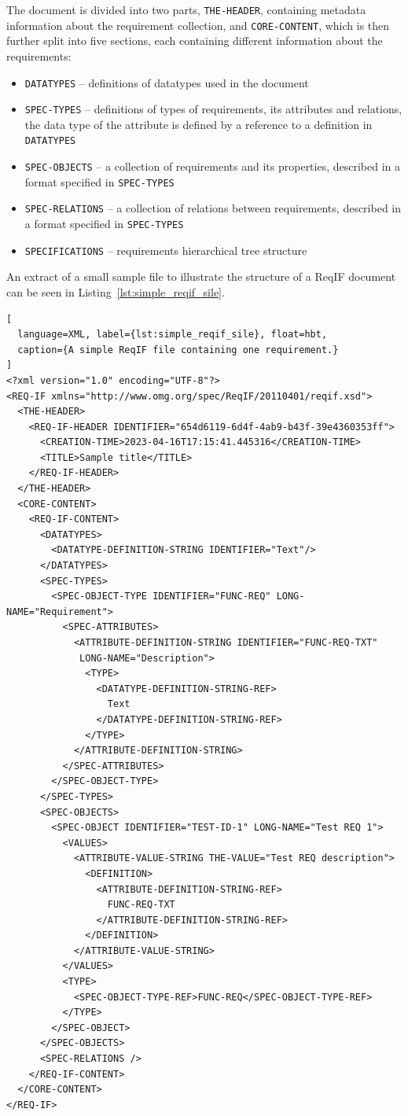 The document is divided into two parts, \texttt{THE-HEADER}, containing metadata information about the requirement collection, and \texttt{CORE-CONTENT}, which is then further split into five sections, each containing different information about the requirements:

\begin{itemize}
  \item \texttt{DATATYPES} -- definitions of datatypes used in the document
  \item \texttt{SPEC-TYPES} -- definitions of types of requirements, its attributes and relations, the data type of the attribute is defined by a reference to a definition in \texttt{DATATYPES}
  \item \texttt{SPEC-OBJECTS} -- a collection of requirements and its properties, described in a format specified in \texttt{SPEC-TYPES}
  \item \texttt{SPEC-RELATIONS} -- a collection of relations between requirements, described in a format specified in \texttt{SPEC-TYPES}
  \item \texttt{SPECIFICATIONS} -- requirements hierarchical tree structure
\end{itemize}

An extract of a small sample file to illustrate the structure of a ReqIF document can be seen in Listing \ref{lst:simple_reqif_sile}.

\begin{lstlisting}[
  language=XML, label={lst:simple_reqif_sile}, float=hbt,
  caption={A simple ReqIF file containing one requirement.}
]
<?xml version="1.0" encoding="UTF-8"?>
<REQ-IF xmlns="http://www.omg.org/spec/ReqIF/20110401/reqif.xsd">
  <THE-HEADER>
    <REQ-IF-HEADER IDENTIFIER="654d6119-6d4f-4ab9-b43f-39e4360353ff">
      <CREATION-TIME>2023-04-16T17:15:41.445316</CREATION-TIME>
      <TITLE>Sample title</TITLE>
    </REQ-IF-HEADER>
  </THE-HEADER>
  <CORE-CONTENT>
    <REQ-IF-CONTENT>
      <DATATYPES>
        <DATATYPE-DEFINITION-STRING IDENTIFIER="Text"/>
      </DATATYPES>
      <SPEC-TYPES>
        <SPEC-OBJECT-TYPE IDENTIFIER="FUNC-REQ" LONG-NAME="Requirement">
          <SPEC-ATTRIBUTES>
            <ATTRIBUTE-DEFINITION-STRING IDENTIFIER="FUNC-REQ-TXT"
             LONG-NAME="Description">
              <TYPE>
                <DATATYPE-DEFINITION-STRING-REF>
                  Text
                </DATATYPE-DEFINITION-STRING-REF>
              </TYPE>
            </ATTRIBUTE-DEFINITION-STRING>
          </SPEC-ATTRIBUTES>
        </SPEC-OBJECT-TYPE>
      </SPEC-TYPES>
      <SPEC-OBJECTS>
        <SPEC-OBJECT IDENTIFIER="TEST-ID-1" LONG-NAME="Test REQ 1">
          <VALUES>
            <ATTRIBUTE-VALUE-STRING THE-VALUE="Test REQ description">
              <DEFINITION>
                <ATTRIBUTE-DEFINITION-STRING-REF>
                  FUNC-REQ-TXT
                </ATTRIBUTE-DEFINITION-STRING-REF>
              </DEFINITION>
            </ATTRIBUTE-VALUE-STRING>
          </VALUES>
          <TYPE>
            <SPEC-OBJECT-TYPE-REF>FUNC-REQ</SPEC-OBJECT-TYPE-REF>
          </TYPE>
        </SPEC-OBJECT>
      </SPEC-OBJECTS>
      <SPEC-RELATIONS />
    </REQ-IF-CONTENT>
  </CORE-CONTENT>
</REQ-IF>
\end{lstlisting}

